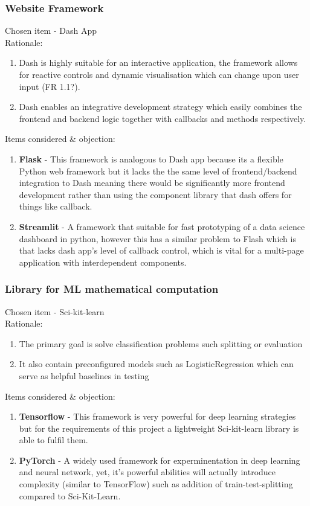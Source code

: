 \documentclass{article}
\begin{document}
\subsubsection{Website Framework}
Chosen item - Dash App \\
\large{Rationale:} \\
\begin{enumerate}
    \item Dash is highly suitable for an interactive application, the framework allows for reactive controls and dynamic visualisation which can change upon user input (FR 1.1?).
    \item Dash enables an integrative development strategy which easily combines the frontend and backend logic together with callbacks and methods respectively. %
\end{enumerate}
\large{Items considered \& objection:} \\
\begin{enumerate}
    \item \textbf{Flask} - This framework is analogous to Dash app because its a flexible Python web framework but it lacks the the same level of frontend/backend integration to Dash meaning there would be significantly more frontend development rather than using the component library that dash offers for things like callback. %
    \item \textbf{Streamlit} - A framework that suitable for fast prototyping of a data science dashboard in python, however this has a similar problem to Flash which is that lacks dash app's level of callback control, which is vital for a multi-page application with interdependent components.
\end{enumerate}

\subsubsection{Library for ML mathematical computation}
Chosen item - Sci-kit-learn \\
\large{Rationale:} \\
\begin{enumerate}
    \item The primary goal is solve classification problems such splitting or evaluation
    \item It also contain preconfigured models such as LogisticRegression which can serve as helpful baselines in testing
\end{enumerate}
\large{Items considered \& objection:} \\
\begin{enumerate}
    \item \textbf{Tensorflow} - This framework is very powerful for deep learning strategies but for the requirements of this project a lightweight Sci-kit-learn library is able to fulfil them.
    \item \textbf{PyTorch} - A widely used framework for experminentation in deep learning and neural network, yet, it's powerful abilities will actually introduce complexity (similar to TensorFlow) such as addition of train-test-splitting compared to Sci-Kit-Learn.
\end{enumerate}
\end{document}
